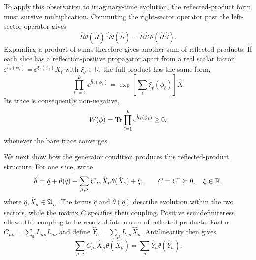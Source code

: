 To apply this observation to imaginary-time evolution, the reflected-product form must survive multiplication. Commuting the right-sector operator past the left-sector operator gives
\begin{equation}
    \hat R\theta(\hat R)\,\hat S\theta(\hat S)
    =
    \hat R\hat S\,\theta(\hat R\hat S).
    \label{eq:rp_multiplication_sm}
\end{equation}
Expanding a product of sums therefore gives another sum of reflected products. If each slice has a reflection-positive propagator apart from a real scalar factor, $\ee^{\hat h_\ell(\phi_\ell)}=\ee^{\xi_\ell(\phi_\ell)}\hat X_\ell$ with $\xi_\ell\in\mathbb R$, the full product has the same form,
\begin{equation}
    \prod_{\ell=1}^{L}\ee^{\hat h_\ell(\phi_\ell)}
    =
    \exp\!\left[\sum_\ell\xi_\ell(\phi_\ell)\right]\hat X.
\end{equation}
Its trace is consequently non-negative,
\begin{equation}
    W(\phi)=\operatorname{Tr}\prod_{\ell=1}^{L}\mathrm{e}^{\hat h_\ell(\phi_\ell)}\ge0,
\end{equation}
whenever the bare trace converges.

We next show how the generator condition produces this reflected-product structure. For one slice, write
\begin{equation}
    \hat h=
    \hat q+\theta(\hat q)
    +\sum_{\mu,\nu}C_{\mu\nu}\hat X_\mu\theta(\hat X_\nu)
    +\xi,
    \qquad
    C=C^\dagger\succeq0,\quad \xi\in\mathbb R,
    \label{eq:rp_generator_sm}
\end{equation}
where $\hat q,\hat X_\mu\in\mathfrak A_L$. The terms $\hat q$ and $\theta(\hat q)$ describe evolution within the two sectors, while the matrix $C$ specifies their coupling. Positive semidefiniteness allows this coupling to be resolved into a sum of reflected products. Factor $C_{\mu\nu}=\sum_a L_{a\mu}\overline{L_{a\nu}}$ and define $\hat Y_a=\sum_\mu L_{a\mu}\hat X_\mu$. Antilinearity then gives
\begin{equation}
    \sum_{\mu,\nu}C_{\mu\nu}\hat X_\mu\theta(\hat X_\nu)
    =\sum_a\hat Y_a\theta(\hat Y_a).
\end{equation}

